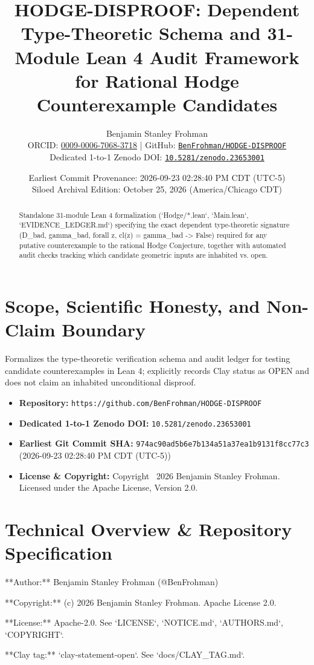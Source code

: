 \documentclass[11pt,a4paper]{article}
\title{\textbf{HODGE-DISPROOF: Dependent Type-Theoretic Schema and 31-Module Lean 4 Audit Framework for Rational Hodge Counterexample Candidates}}
\author{Benjamin Stanley Frohman\\
\small ORCID: \href{https://orcid.org/0009-0006-7068-3718}{0009-0006-7068-3718} \quad|\quad
GitHub: \href{https://github.com/BenFrohman/HODGE-DISPROOF}{\texttt{BenFrohman/HODGE-DISPROOF}}\\
\small Dedicated 1-to-1 Zenodo DOI: \href{https://doi.org/10.5281/zenodo.23653001}{\texttt{10.5281/zenodo.23653001}}}
\date{Earliest Commit Provenance: 2026-09-23 02:28:40 PM CDT (UTC-5)\\
Siloed Archival Edition: October 25, 2026 (America/Chicago CDT)}
\begin{document}
\maketitle

\begin{abstract}
Standalone 31-module Lean 4 formalization (`Hodge/*.lean`, `Main.lean`, `EVIDENCE\_LEDGER.md`) specifying the exact dependent type-theoretic signature (D\_bad, gamma\_bad, forall z, cl(z) = gamma\_bad -> False) required for any putative counterexample to the rational Hodge Conjecture, together with automated audit checks tracking which candidate geometric inputs are inhabited vs. open.
\end{abstract}

\section{Scope, Scientific Honesty, and Non-Claim Boundary}
Formalizes the type-theoretic verification schema and audit ledger for testing candidate counterexamples in Lean 4; explicitly records Clay status as OPEN and does not claim an inhabited unconditional disproof.

\begin{itemize}
  \item \textbf{Repository:} \texttt{https://github.com/BenFrohman/HODGE-DISPROOF}
  \item \textbf{Dedicated 1-to-1 Zenodo DOI:} \texttt{10.5281/zenodo.23653001}
  \item \textbf{Earliest Git Commit SHA:} \texttt{974ac90ad5b6e7b134a51a37ea1b9131f8cc77c3} (2026-09-23 02:28:40 PM CDT (UTC-5))
  \item \textbf{License \& Copyright:} Copyright \textcopyright\ 2026 Benjamin Stanley Frohman. Licensed under the Apache License, Version 2.0.
\end{itemize}

\section{Technical Overview \& Repository Specification}
**Author:** Benjamin Stanley Frohman (@BenFrohman)

**Copyright:** (c) 2026 Benjamin Stanley Frohman. Apache License 2.0.

**License:** Apache-2.0. See `LICENSE`, `NOTICE.md`, `AUTHORS.md`, `COPYRIGHT`.

**Clay tag:** `clay-statement-open`. See `docs/CLAY\_TAG.md`.
\end{document}
